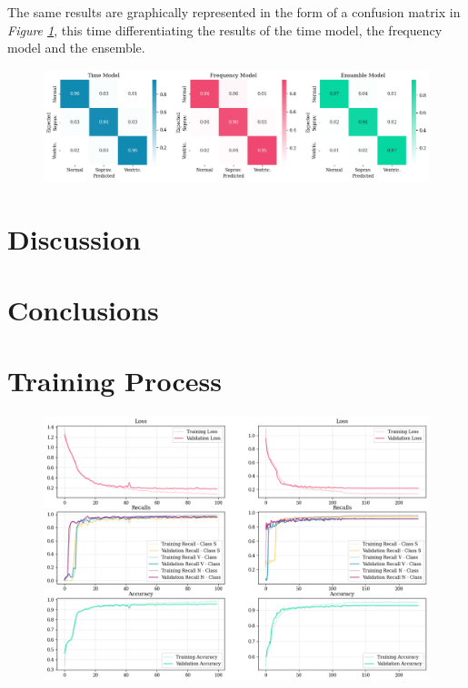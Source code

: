 \documentclass[conference]{IEEEtran}
\newcommand{\fig}[1]{\textit{Figure \ref{#1}}}
\begin{document}
    The same results are graphically represented in the form of a confusion
    matrix in \fig{fig:confmat}, this time differentiating the results of the
    time model, the frequency model and the ensemble.

    \begin{figure}
        \centering
        \includegraphics[width=\linewidth]{img/confmatr.png}
        \caption{}
        \label{fig:confmat}
    \end{figure}

\section{Discussion}

\section{Conclusions}




\appendices
\section{Training Process}
\begin{figure}
    \centering
    \includegraphics[width=\linewidth]{img/training.png}
    \caption{}
    \label{app:training}
\end{figure}
\end{document}
